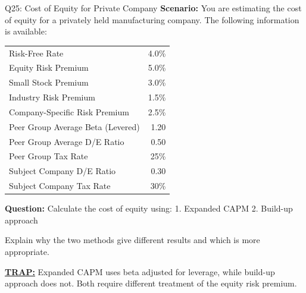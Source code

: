 \documentclass{beamer}
\renewcommand{\scriptsize}{\fontsize{6pt}{7pt}\selectfont}
\begin{document}
	\begin{frame}{Q25: Cost of Equity for Private Company}
		\scriptsize
		\textbf{Scenario:} You are estimating the cost of equity for a privately held manufacturing company. The following information is available:
		
		\begin{tabular}{lr}
			Risk-Free Rate & 4.0\% \\
			Equity Risk Premium & 5.0\% \\
			Small Stock Premium & 3.0\% \\
			Industry Risk Premium & 1.5\% \\
			Company-Specific Risk Premium & 2.5\% \\
			Peer Group Average Beta (Levered) & 1.20 \\
			Peer Group Average D/E Ratio & 0.50 \\
			Peer Group Tax Rate & 25\% \\
			Subject Company D/E Ratio & 0.30 \\
			Subject Company Tax Rate & 30\% \\
		\end{tabular}
		
		\textbf{Question:} Calculate the cost of equity using:
		1. Expanded CAPM
		2. Build-up approach
		
		Explain why the two methods give different results and which is more appropriate.
		
		\vspace{2pt}
		\underline{\textbf{TRAP:}} Expanded CAPM uses beta adjusted for leverage, while build-up approach does not. Both require different treatment of the equity risk premium.
	\end{frame}
	
\end{document}
